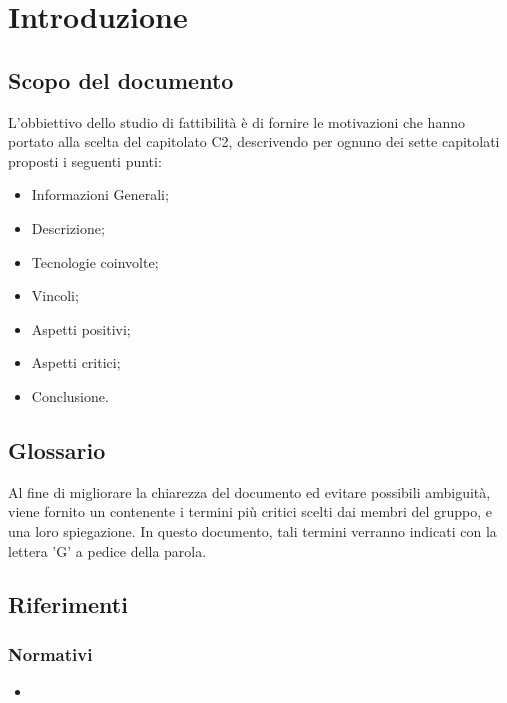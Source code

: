 \section{Introduzione}

\subsection{Scopo del documento}
L'obbiettivo dello studio di fattibilità è di fornire le motivazioni che hanno portato alla scelta del capitolato C2, descrivendo per ognuno dei sette capitolati proposti i seguenti punti:
\begin{itemize}
\item Informazioni Generali;
\item Descrizione;
\item Tecnologie coinvolte;
\item Vincoli;
\item Aspetti positivi;
\item Aspetti critici;
\item Conclusione.
\end{itemize}

\subsection{Glossario}
Al fine di migliorare la chiarezza del documento ed evitare possibili ambiguità, viene fornito un \Glossario{} contenente i termini più critici scelti dai membri del gruppo, e una loro spiegazione. In questo documento, tali termini verranno indicati con la lettera 'G' a pedice della parola. 

\subsection{Riferimenti}
\subsubsection{Normativi}
\begin{itemize}
\item {}
\end{itemize}

